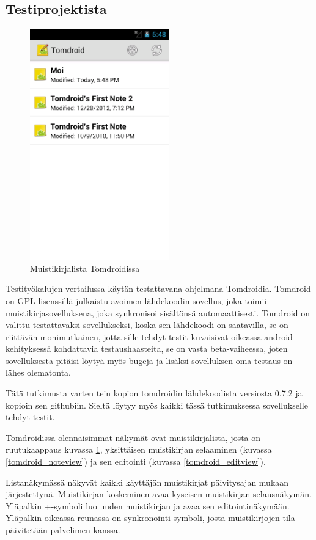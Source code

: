 \subsection{Testiprojektista}

\begin{figure}[htb]
\includegraphics[width=60mm]{tomdroid_notelist.png}
\caption{Muistikirjalista Tomdroidissa} \label{tomdroid_notelist}
\end{figure}

Testityökalujen vertailussa käytän testattavana ohjelmana Tomdroidia. Tomdroid on GPL-lisenssillä julkaistu avoimen lähdekoodin sovellus, joka toimii muistikirjasovelluksena, joka synkronisoi sisältönsä automaattisesti. \cite{tomdroid} Tomdroid on valittu testattavaksi sovellukseksi, koska sen lähdekoodi on saatavilla, se on riittävän monimutkainen, jotta sille tehdyt testit kuvaisivat oikeassa android-kehityksessä kohdattavia testaushaasteita, se on vasta beta-vaiheessa, joten sovelluksesta pitäisi löytyä myös bugeja ja lisäksi sovelluksen oma testaus on lähes olematonta.

Tätä tutkimusta varten tein kopion tomdroidin lähdekoodista versiosta 0.7.2 ja kopioin sen githubiin. Sieltä löytyy myös kaikki tässä tutkimuksessa sovellukselle tehdyt testit. \cite{tomdroid_github}

Tomdroidissa olennaisimmat näkymät ovat muistikirjalista, josta on ruutukaappaus kuvassa \ref{tomdroid_notelist}, yksittäisen muistikirjan selaaminen (kuvassa \ref{tomdroid_noteview}) ja sen editointi (kuvassa \ref{tomdroid_editview}). 

Listanäkymässä näkyvät kaikki käyttäjän muistikirjat päivitysajan mukaan järjestettynä. Muistikirjan koskeminen avaa kyseisen muistikirjan selausnäkymän. Yläpalkin +-symboli luo uuden muistikirjan ja avaa sen editointinäkymään. Yläpalkin oikeassa reunassa on synkronointi-symboli, josta muistikirjojen tila päivitetään palvelimen kanssa.

